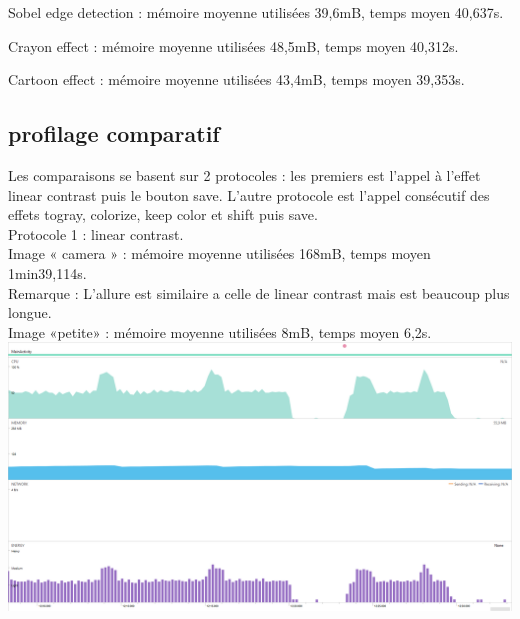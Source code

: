 \documentclass[12pt]{article}
\begin{document}
\begin{itemize}
 \bigskip




    Sobel edge detection : mémoire moyenne utilisées 39,6mB, temps moyen 40,637s.\\

 \bigskip




    Crayon effect : mémoire moyenne utilisées 48,5mB, temps moyen 40,312s.\\

 \bigskip




    Cartoon effect : mémoire moyenne utilisées 43,4mB, temps moyen 39,353s.\\

 \bigskip





     \subsection{profilage comparatif } 
 \bigskip



    Les comparaisons se basent sur 2 protocoles : les premiers est l’appel à l’effet linear contrast  puis le bouton save. L’autre protocole est l’appel consécutif des effets togray, colorize, keep color et shift puis save. \\


    Protocole 1 : linear contrast.\\

    Image « camera » : mémoire moyenne utilisées 168mB, temps moyen 1min39,114s.\\

    Remarque :
    L’allure est similaire a celle de linear contrast mais est beaucoup plus longue. \\


    Image «petite» : mémoire moyenne utilisées 8mB, temps moyen 6,2s.\\

    \includegraphics[width=\textwidth]{petite-linear}
 \bigskip




\end{itemize}
\end{document}
